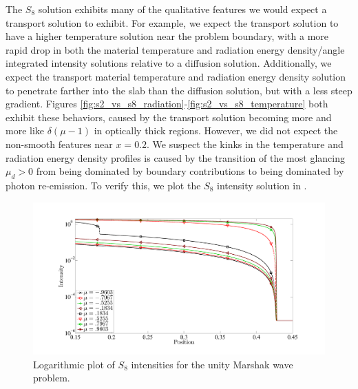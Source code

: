 The $S_8$ solution exhibits many of the qualitative features we would expect a transport solution to exhibit. %
For example, we expect the transport solution to have a higher temperature solution near the problem boundary, with a more rapid drop in both the material temperature and radiation energy density/angle integrated intensity solutions relative to a diffusion solution.
Additionally, we expect the transport material temperature and radiation energy density solution to penetrate farther into the slab than the diffusion solution, but with a less steep gradient.
Figures \ref{fig:s2_vs_s8_radiation}-\ref{fig:s2_vs_s8_temperature} both exhibit these behaviors, caused by the transport solution becoming more and more like $\delta(\mu-1)$ in optically thick regions. 
However, we did not expect the non-smooth features near $x=0.2$.
We suspect the kinks in the temperature and radiation energy density profiles is caused by the transition of the most glancing $\mu_d >0$ from being dominated by boundary contributions to being dominated by photon re-emission.
To verify this, we plot the $S_8$ intensity solution in .
\begin{figure}[!htp]
\centering
\includegraphics[width=16cm,trim=1.5in  0.5in 0.2in 1in,clip=true]{chapter6_grey_radtran/S8_Intensity_SemiLogy.pdf}
\caption{Logarithmic plot of $S_8$ intensities for the unity Marshak wave problem.}
\label{fig:s8_intensity_full}
\end{figure}

